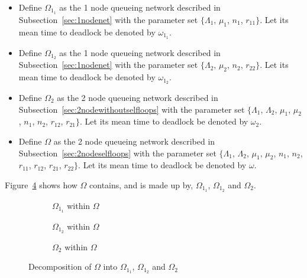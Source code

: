 \documentclass{article}
\begin{document}
\begin{itemize}
  \item Define $\Omega_{1_1}$ as the 1 node queueing network described in Subsection~\ref{sec:1nodenet} with the parameter set $\{\Lambda_1$, $\mu_1$, $n_1$, $r_{11}\}$. Let its mean time to deadlock be denoted by $\omega_{1_1}$.
  \item Define $\Omega_{1_2}$ as the 1 node queueing network described in Subsection~\ref{sec:1nodenet} with the parameter set $\{\Lambda_2$, $\mu_2$, $n_2$, $r_{22}\}$. Let its mean time to deadlock be denoted by $\omega_{1_2}$.
  \item Define $\Omega_2$ as the 2 node queueing network described in Subsection~\ref{sec:2nodewithoutselfloops} with the parameter set $\{\Lambda_1$, $\Lambda_2$, $\mu_1$, $\mu_2$, $n_1$, $n_2$, $r_{12}$, $r_{21}\}$. Let its mean time to deadlock be denoted by $\omega_2$.
  \item Define $\Omega$ as the 2 node queueing network described in Subsection~\ref{sec:2nodeselfloops} with the parameter set $\{\Lambda_1$, $\Lambda_2$, $\mu_1$, $\mu_2$, $n_1$, $n_2$, $r_{11}$, $r_{12}$, $r_{21}$, $r_{22}\}$. Let its mean time to deadlock be denoted by $\omega$.
\end{itemize}

Figure~\ref{fig:decomposeqnet} shows how $\Omega$ contains, and is made up by, $\Omega_{1_1}$, $\Omega_{1_2}$ and $\Omega_2$.

\begin{figure}[H]
\begin{subfigure}[b]{0.5\textwidth}
  
  \caption{$\Omega_{1_1}$ within $\Omega$}
  \label{fig:omega11withinomega}
\end{subfigure}
\begin{subfigure}[b]{0.5\textwidth}
  
  \caption{$\Omega_{1_2}$ within $\Omega$}
  \label{fig:omega12withinomega}
\end{subfigure}
\begin{center}
\begin{subfigure}[b]{0.5\textwidth}
  
  \caption{$\Omega_2$ within $\Omega$}
  \label{fig:omega2withinomega}
\end{subfigure}
\end{center}
\caption{Decomposition of $\Omega$ into $\Omega_{1_1}$, $\Omega_{1_2}$ and $\Omega_2$}
\label{fig:decomposeqnet}
\end{figure}
\end{document}
